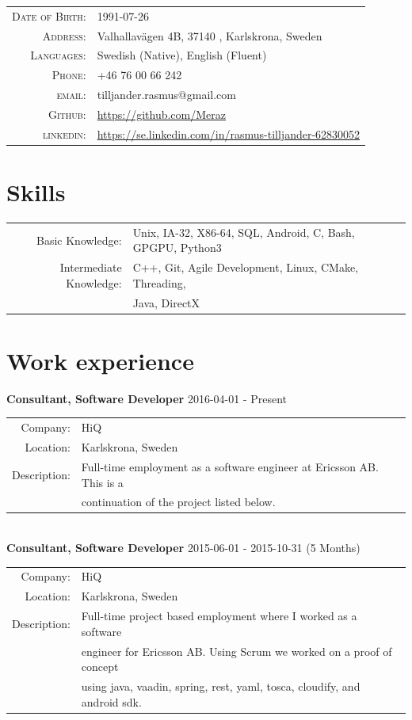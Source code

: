 \documentclass[a4paper,10pt]{article}
\begin{document}

\vspace{5 mm}
\begin{tabular}{rl}
    \textsc{Date of Birth:} &  1991-07-26   \\
    \textsc{Address:}   & Valhallavägen 4B, 37140 , Karlskrona, Sweden \\
    \textsc{Languages:}  & Swedish (Native), English (Fluent) \\
    \textsc{Phone:}     & +46 76 00 66 242\\
    \textsc{email:}     & tilljander.rasmus@gmail.com\\
    \textsc{Github:}  & \url{https://github.com/Meraz}\\
    \textsc{linkedin:}  & \url{https://se.linkedin.com/in/rasmus-tilljander-62830052}
\end{tabular}
\section{Skills}
\begin{tabular}{rl}
Basic Knowledge:& Unix, IA-32, X86-64, SQL, Android, C, Bash, GPGPU, Python3 \\
Intermediate Knowledge:& \textsc{C++}, Git, Agile Development, Linux, CMake, Threading,\\&  Java, DirectX\\
\end{tabular}

\section{Work experience}
\textbf{Consultant, Software Developer} 2016-04-01 - Present \\
\begin{tabular}{rl}
Company:& HiQ \\
Location:& Karlskrona, Sweden \\
Description:& Full-time employment as a software engineer at Ericsson AB. This is a\\&
continuation of the project listed below.
\end{tabular}\\

\textbf{Consultant, Software Developer} 2015-06-01 - 2015-10-31 (5 Months)\\
\begin{tabular}{rl}
Company:& HiQ \\
Location:& Karlskrona, Sweden \\
Description:& Full-time project based employment where I worked as a software \\&
engineer for Ericsson AB. Using Scrum we worked on a proof of concept\\& 
using
java, vaadin, spring, rest, yaml, tosca, cloudify, and android sdk.\\
\end{tabular}\\
\end{document}
